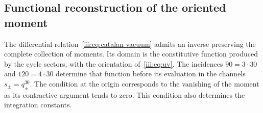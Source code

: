 \subsection{Functional reconstruction of the oriented moment}
\label{iii:sec:restitucion-funcional-catalan}

The differential relation~\eqref{iii:eq:catalan-vacuum} admits an
inverse preserving the complete collection of moments. Its domain is
the constitutive function produced by the cycle sectors, with the
orientation of~\eqref{iii:eq:uv}. The incidences $90=3\cdot30$ and
$120=4\cdot30$ determine that function before its evaluation in the channels
$s_\pm=q_\pm^{30}$. The condition at the origin corresponds to the
vanishing of the moment as its contractive argument tends to zero.
This condition also determines the integration constants.

